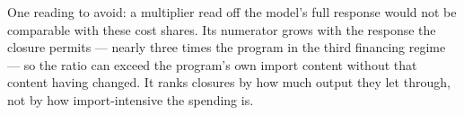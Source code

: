 One reading to avoid: a multiplier read off the model's full response would not be comparable
with these cost shares. Its numerator grows with the response the closure permits --- nearly
three times the program in the third financing regime --- so the ratio can exceed the
program's own import content without that content having changed. It ranks closures by how
much output they let through, not by how import-intensive the spending is.
